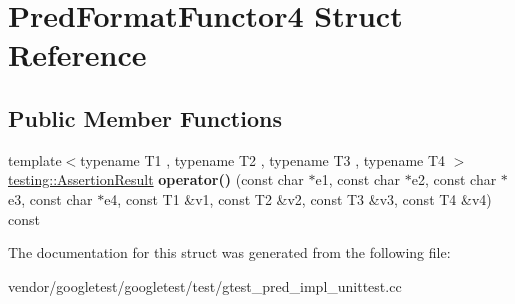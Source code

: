\hypertarget{struct_pred_format_functor4}{}\section{Pred\+Format\+Functor4 Struct Reference}
\label{struct_pred_format_functor4}
\subsection*{Public Member Functions}
\begin{DoxyCompactItemize}
\item 
\mbox{\label{struct_pred_format_functor4_a97061d2b9eadf357f4e50a75f5a9af5b}} 
{\footnotesize template$<$typename T1 , typename T2 , typename T3 , typename T4 $>$ }\\\hyperlink{classtesting_1_1_assertion_result}{testing\+::\+Assertion\+Result} {\bfseries operator()} (const char $\ast$e1, const char $\ast$e2, const char $\ast$e3, const char $\ast$e4, const T1 \&v1, const T2 \&v2, const T3 \&v3, const T4 \&v4) const
\end{DoxyCompactItemize}


The documentation for this struct was generated from the following file\+:\begin{DoxyCompactItemize}
\item 
vendor/googletest/googletest/test/gtest\+\_\+pred\+\_\+impl\+\_\+unittest.\+cc\end{DoxyCompactItemize}
